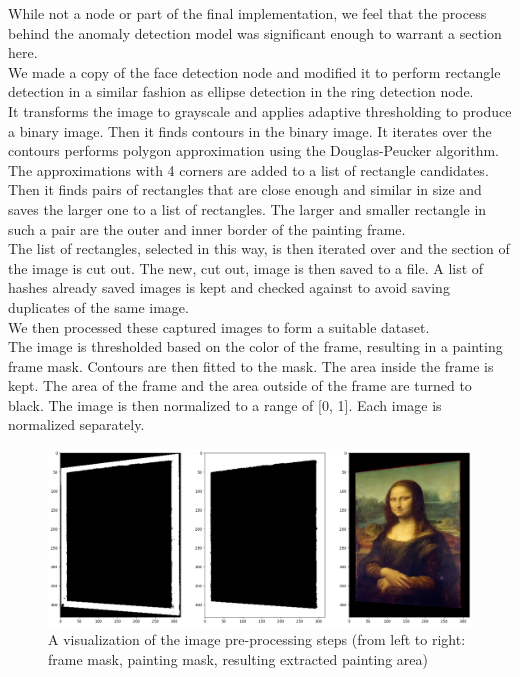 \documentclass[a4paper,
  twoside, %
  headlines=2.1 %
  ]{scrartcl}
\begin{document}
While not a node or part of the final implementation, we feel that the process behind the anomaly detection model was significant enough to warrant a section here.
\\
We made a copy of the face detection node and modified it to perform rectangle detection in a similar fashion as ellipse detection in the ring detection node. 
\\
It transforms the image to grayscale and applies adaptive thresholding to produce a binary image. Then it finds contours in the binary image. It iterates over the contours performs polygon approximation using the Douglas-Peucker algorithm. The approximations with 4 corners are added to a list of rectangle candidates. Then it finds pairs of rectangles that are close enough and similar in size and saves the larger one to a list of rectangles. The larger and smaller rectangle in such a pair are the outer and inner border of the painting frame. 
\\
The list of rectangles, selected in this way, is then iterated over and the section of the image is cut out. The new, cut out, image is then saved to a file. A list of hashes already saved images is kept and checked against to avoid saving duplicates of the same image. 
\\
We then processed these captured images to form a suitable dataset. 
\\
The image is thresholded based on the color of the frame, resulting in a painting frame mask. Contours are then fitted to the mask. The area inside the frame is kept. The area of the frame and the area outside of the frame are turned to black. The image is then normalized to a range of [0, 1]. Each image is normalized separately. 
\begin{figure}[H]
  \centering
  \includegraphics[scale=0.4]{dataset preparation 1.png}
  \caption{A visualization of the image pre-processing steps (from left to right: frame mask, painting mask, resulting extracted painting area)}   
\end{figure}
\end{document}

